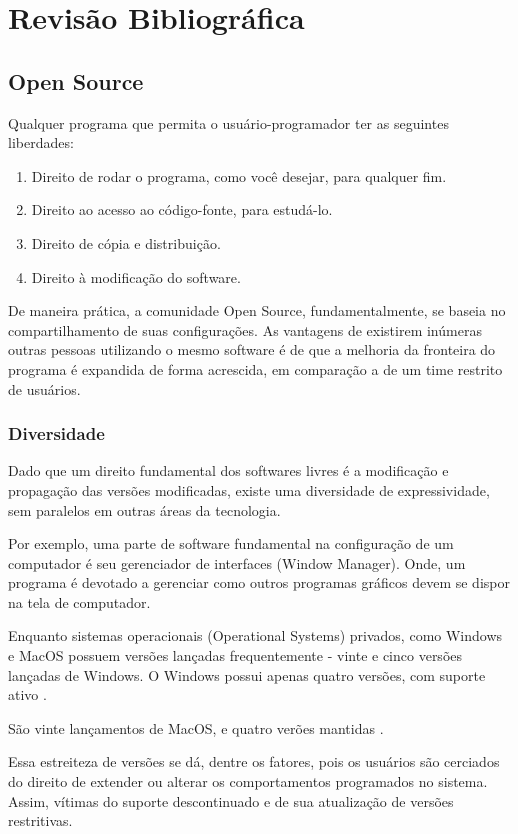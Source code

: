 \documentclass[
12pt,				%
openright,			%
oneside,			%
a4paper,			%
english,			%
french,				%
spanish,			%
brazil,				%
]{abntex2}
\begin{document}
\chapter{Revisão Bibliográfica}
\section{Open Source}
\label{sec:opensource}
Qualquer programa que permita o usuário-programador ter as seguintes liberdades:

\begin{enumerate}
\item Direito de rodar o programa, como você desejar, para qualquer fim.
\item Direito ao acesso ao código-fonte, para estudá-lo.
\item Direito de cópia e distribuição.
\item Direito à modificação do software.
\end{enumerate}

De maneira prática, a comunidade Open Source, fundamentalmente, se baseia no compartilhamento de suas configurações. As vantagens de existirem inúmeras outras pessoas utilizando o mesmo software é de que a melhoria da fronteira do programa é expandida de forma acrescida, em comparação a de um time restrito de usuários.

\subsection{Diversidade}
\label{sec:diversidade}

Dado que um direito fundamental dos softwares livres é a modificação e propagação das versões modificadas, existe uma diversidade de expressividade, sem paralelos em outras áreas da tecnologia.

Por exemplo, uma parte de software fundamental na configuração de um computador é seu gerenciador de interfaces (Window Manager). Onde, um programa é devotado a gerenciar como outros programas gráficos devem se dispor na tela de computador.

Enquanto sistemas operacionais (Operational Systems) privados, como Windows e MacOS possuem versões lançadas frequentemente - vinte e cinco versões lançadas de Windows. O Windows possui apenas quatro versões, com suporte ativo \cite{wikipedia_2021W}.

São vinte lançamentos de MacOS, e quatro verões mantidas \cite{wikipedia_2021Mac}.

Essa estreiteza de versões se dá, dentre os fatores, pois os usuários são cerciados do direito de extender ou alterar os comportamentos programados no sistema. Assim, vítimas do suporte descontinuado e de sua atualização de versões restritivas.
\end{document}
